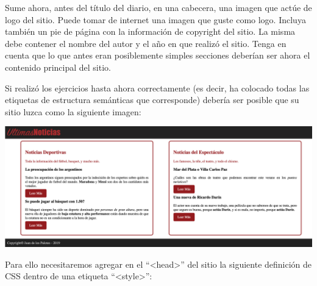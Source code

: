 \begin{exercise}
Sume ahora, antes del título del diario, en una cabecera, una imagen que
actúe de logo del sitio. Puede tomar de internet una imagen que guste
como logo. Incluya también un pie de página con la información de copyright
del sitio. La misma debe contener el nombre del autor y el año en que
realizó el sitio. Tenga en cuenta que lo que antes eran posiblemente
simples secciones deberían ser ahora el contenido principal del sitio.
\end{exercise}

\begin{exercise}
Si realizó los ejercicios hasta ahora correctamente (es decir, ha colocado
todas las etiquetas de estructura semánticas que corresponde) debería ser
posible que su sitio luzca como la siguiente imagen:

\includegraphics[scale=0.3]{anexos/html/imagenes/diario_4.png}

Para ello necesitaremos agregar en el ``<head>'' del sitio la siguiente
definición de CSS dentro de una etiqueta ``<style>'':


\end{exercise}

